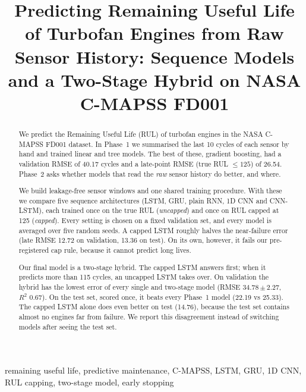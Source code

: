 \documentclass[conference]{IEEEtran}
\begin{document}
\title{Predicting Remaining Useful Life of Turbofan Engines from Raw Sensor History: Sequence Models and a Two-Stage Hybrid on NASA C-MAPSS FD001}

\author{
}

\maketitle

\begin{abstract}
We predict the Remaining Useful Life (RUL) of turbofan engines in the NASA C-MAPSS FD001 dataset. In Phase~1 we summarised the last 10 cycles of each sensor by hand and trained linear and tree models. The best of these, gradient boosting, had a validation RMSE of 40.17 cycles and a late-point RMSE (true RUL $\le 125$) of 26.54. Phase~2 asks whether models that read the \emph{raw} sensor history do better, and where.

We build leakage-free sensor windows and one shared training procedure. With these we compare five sequence architectures (LSTM, GRU, plain RNN, 1D CNN and CNN-LSTM), each trained once on the true RUL (\emph{uncapped}) and once on RUL capped at 125 (\emph{capped}). Every setting is chosen on a fixed validation set, and every model is averaged over five random seeds. A capped LSTM roughly halves the near-failure error (late RMSE 12.72 on validation, 13.36 on test). On its own, however, it fails our pre-registered cap rule, because it cannot predict long lives.

Our final model is a two-stage hybrid. The capped LSTM answers first; when it predicts more than 115 cycles, an uncapped LSTM takes over. On validation the hybrid has the lowest error of every single and two-stage model (RMSE 34.78\,$\pm$\,2.27, $R^2$ 0.67). On the test set, scored once, it beats every Phase~1 model (22.19 vs 25.33). The capped LSTM alone does even better on test (14.76), because the test set contains almost no engines far from failure. We report this disagreement instead of switching models after seeing the test set.
\end{abstract}

\begin{IEEEkeywords}
remaining useful life, predictive maintenance, C-MAPSS, LSTM, GRU, 1D CNN, RUL capping, two-stage model, early stopping
\end{IEEEkeywords}
\end{document}
